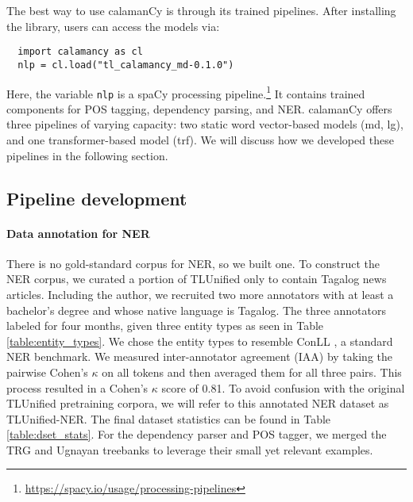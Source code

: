\documentclass[11pt]{article}
\begin{document}
The best way to use calamanCy is through its trained pipelines.
After installing the library, users can access the models via:

\begin{verbatim}
  import calamancy as cl
  nlp = cl.load("tl_calamancy_md-0.1.0")
\end{verbatim}

Here, the variable \texttt{nlp} is a spaCy processing pipeline.\footnote[2]{\url{https://spacy.io/usage/processing-pipelines}}
It contains trained components for POS tagging, dependency parsing, and NER.
calamanCy offers three pipelines of varying capacity: two static word vector-based models (md, lg), and one transformer-based model (trf).
We will discuss how we developed these pipelines in the following section.

\subsection{Pipeline development}

\paragraph*{Data annotation for NER}
There is no gold-standard corpus for NER, so we built one. 
To construct the NER corpus, we curated a portion of TLUnified \citep{Cruz2021ImprovingLL} only to contain Tagalog news articles.
Including the author, we recruited two more annotators with at least a bachelor's degree and whose native language is Tagalog.
The three annotators labeled for four months, given three entity types as seen in Table \ref{table:entity_types}.
We chose the entity types to resemble ConLL \citep{Sang2002IntroductionTT,Sang2003IntroductionTT}, a standard NER benchmark.
We measured inter-annotator agreement (IAA) by taking the pairwise Cohen's $\kappa$ on all tokens and then averaged them for all three pairs.
This process resulted in a Cohen's $\kappa$ score of 0.81. 
To avoid confusion with the original TLUnified pretraining corpora, we will refer to this annotated NER dataset as TLUnified-NER.
The final dataset statistics can be found in Table \ref{table:dset_stats}.
For the dependency parser and POS tagger, we merged the TRG \citep{Samson2018TRG} and Ugnayan \citep{Aquino2020ParsingIT} treebanks to leverage their small yet relevant examples.




\end{document}
